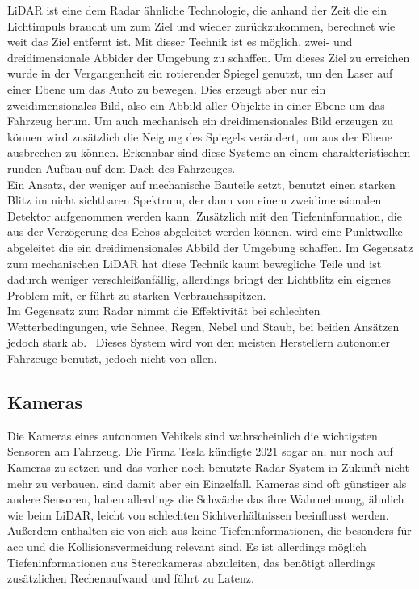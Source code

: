 \documentclass[conference,compsoc,final,a4paper]{IEEEtran}
\begin{document}
\ac{LiDAR} ist eine dem Radar ähnliche Technologie, die anhand der Zeit die ein Lichtimpuls braucht um zum Ziel und wieder zurückzukommen, berechnet wie weit das Ziel entfernt ist.
Mit dieser Technik ist es möglich, zwei- und dreidimensionale Abbider der Umgebung zu schaffen.
Um dieses Ziel zu erreichen wurde in der Vergangenheit ein rotierender Spiegel genutzt, um den Laser auf einer Ebene um das Auto zu bewegen.
Dies erzeugt aber nur ein zweidimensionales Bild, also ein Abbild aller Objekte in einer Ebene um das Fahrzeug herum.
Um auch mechanisch ein dreidimensionales Bild erzeugen zu können wird zusätzlich die Neigung des Spiegels verändert, um aus der Ebene ausbrechen zu können.
Erkennbar sind diese Systeme an einem charakteristischen runden Aufbau auf dem Dach des Fahrzeuges.\\
Ein Ansatz, der weniger auf mechanische Bauteile setzt, benutzt einen starken Blitz im nicht sichtbaren Spektrum, der dann von einem zweidimensionalen Detektor aufgenommen werden kann.
Zusätzlich mit den Tiefeninformation, die aus der Verzögerung des Echos abgeleitet werden können, wird eine Punktwolke abgeleitet die ein dreidimensionales Abbild der Umgebung
schaffen. Im Gegensatz zum mechanischen \ac{LiDAR} hat diese Technik kaum bewegliche Teile und ist dadurch weniger verschleißanfällig, allerdings bringt der Lichtblitz ein eigenes Problem mit,
er führt zu starken Verbrauchsspitzen.~\cite{Zhaohua2020}\\
Im Gegensatz zum Radar nimmt die Effektivität bei schlechten Wetterbedingungen, wie Schnee, Regen, Nebel und Staub, bei beiden Ansätzen jedoch stark ab.~\cite{Neal2018}
Dieses System wird von den meisten Herstellern autonomer Fahrzeuge benutzt, jedoch nicht von allen.~\cite{Dickson2021}

\subsection{Kameras}

Die Kameras eines autonomen Vehikels sind wahrscheinlich die wichtigsten Sensoren am Fahrzeug.
Die Firma Tesla kündigte 2021 sogar an, nur noch auf Kameras zu setzen und das vorher noch benutzte Radar-System in Zukunft nicht mehr zu verbauen, sind damit aber ein Einzelfall.\cite{Koellner2022}
Kameras sind oft günstiger als andere Sensoren, haben allerdings die Schwäche das ihre Wahrnehmung, ähnlich wie beim LiDAR, leicht von schlechten Sichtverhältnissen beeinflusst werden.
Außerdem enthalten sie von sich aus keine Tiefeninformationen, die besonders für \ac{acc} und die Kollisionsvermeidung relevant sind.
Es ist allerdings möglich Tiefeninformationen aus Stereokameras abzuleiten, das benötigt allerdings zusätzlichen Rechenaufwand und führt zu Latenz.~\cite{Petit2022}\par
\end{document}
